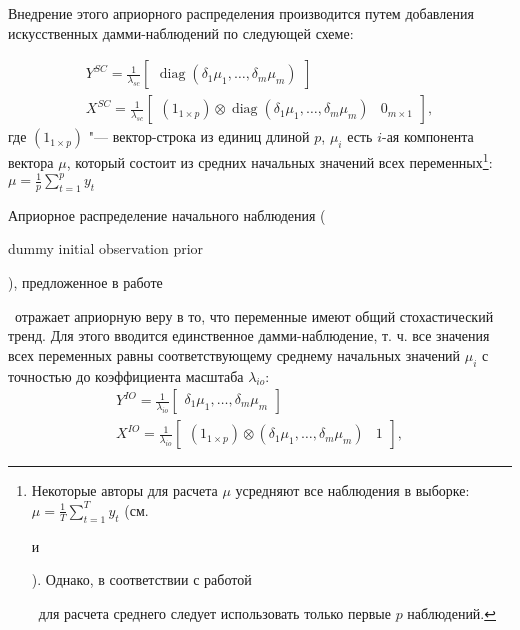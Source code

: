 \documentclass[11pt]{article} %
\DeclareMathOperator{\diag}{diag}
\newcommand{\post}{\overline}
\newcommand{\eng}[1]{\begin{otherlanguage}{english}#1\end{otherlanguage}}
\begin{document}
Внедрение этого априорного распределения производится путем добавления искусственных дамми-наблюдений по следующей схеме:


\begin{gather}
Y^{SC}=\frac{1}{\lambda_{sc}}\begin{bmatrix}\diag(\delta_1\mu_1,\ldots,\delta_m\mu_m)\end{bmatrix}\\
X^{SC}=\frac{1}{\lambda_{sc}}\begin{bmatrix}(1_{1\times p})\otimes \diag(\delta_1\mu_1,\ldots,\delta_m\mu_m) &0_{m\times 1}\end{bmatrix},
\end{gather}
где $(1_{1\times p})$ "--- вектор-строка из единиц длиной $p$, $\mu_i$ есть $i$-ая компонента вектора $\mu$, который состоит из средних начальных значений всех переменных\footnote{Некоторые авторы для  расчета $\mu$ усредняют все наблюдения в выборке: $\mu=\frac{1}{T}\sum_{t=1}^T y_t$ (см. \eng{\cite{banbura_al_2010}} и \eng{\cite{carriero_al_2015}}). Однако, в соответствии с работой \eng{\cite{sims_zha_1998}}~для расчета среднего следует использовать только первые $p$ наблюдений.}: $\mu=\frac{1}{p}\sum_{t=1}^p y_t$

Априорное распределение начального наблюдения (\eng{dummy initial observation prior}), предложенное в работе \eng{\cite{sims_1993}}~отражает априорную веру в то, что переменные имеют общий стохастический тренд. Для этого вводится единственное дамми-наблюдение, т. ч. все значения всех переменных равны соответствующему среднему начальных значений $\mu_i$ с точностью до коэффициента масштаба $\lambda_{io}$:
\begin{gather}
Y^{IO}=\frac{1}{\lambda_{io}}\begin{bmatrix}
\delta_1\mu_1,\ldots,\delta_m\mu_m
\end{bmatrix}\\
X^{IO}=\frac{1}{\lambda_{io}}\begin{bmatrix}
(1_{1\times p})\otimes (\delta_1\mu_1,\ldots,\delta_m\mu_m) &1
\end{bmatrix},
\end{gather}
\end{document}
